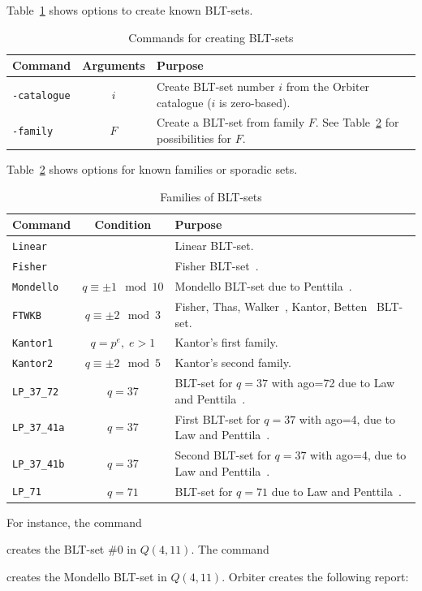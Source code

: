 Table~\ref{tab:BLT:create} shows options to create known BLT-sets.
\begin{table}
\begin{center}
\begin{tabular}{|p{4cm}|c|p{8cm}|}
\hline
Command & Arguments & Purpose \\
\hline
\hline
\verb'-catalogue' & $i$ & Create BLT-set number $i$ from the Orbiter catalogue ($i$ is zero-based). \\
\hline
\verb'-family' & $F$ & Create a BLT-set from family $F$. See Table~\ref{tab:BLT:families} for possibilities for $F$.\\
\hline
\end{tabular}
\end{center}
\caption{\label{tab:BLT:create}Commands for creating BLT-sets}
\end{table}
Table~\ref{tab:BLT:families} shows options for known families or sporadic sets.
\begin{table}
\begin{center}
\begin{tabular}{|p{4cm}|c|p{8cm}|}
\hline
Command & Condition & Purpose \\
\hline
\hline
\verb'Linear' &  & Linear BLT-set. \\
\hline
\verb'Fisher' &  & Fisher BLT-set~\cite{FisherThas79}. \\
\hline
\verb'Mondello' & $q \equiv \pm 1 \mod 10$ & Mondello BLT-set due to Penttila~\cite{Penttila98}. \\
\hline
\verb'FTWKB' & $q \equiv \pm 2 \mod 3$ & Fisher, Thas, Walker~\cite{Walker76}, Kantor, Betten~\cite{Betten73} BLT-set. \\
\hline
\verb'Kantor1' & $q=p^e, \; e > 1$ & Kantor's first family. \\
\hline
\verb'Kantor2' & $q \equiv \pm 2 \mod 5$ & Kantor's second family. \\
\hline
\verb'LP_37_72' & $q=37$ & BLT-set for $q=37$ with ago=72 due to Law and Penttila~\cite{LawPenttila04}. \\
\hline
\verb'LP_37_41a' & $q=37$  & First BLT-set for $q=37$ with ago=4, due to Law and Penttila~\cite{LawPenttila04}. \\
\hline
\verb'LP_37_41b' & $q=37$  & Second BLT-set for $q=37$ with ago=4, due to Law and Penttila~\cite{LawPenttila04}. \\
\hline
\verb'LP_71' & $q=71$  & BLT-set for $q=71$ due to Law and Penttila~\cite{LawPenttila04}. \\
\hline
\end{tabular}
\end{center}
\caption{\label{tab:BLT:families}Families of BLT-sets}
\end{table}
For instance, the command
{\tt

}
creates the BLT-set \#0 in $Q(4,11).$
The command
{\tt

}
creates the Mondello BLT-set in $Q(4,11).$
Orbiter creates the following report:
\begin{mdframed}[style=MyFrame]

\end{mdframed}



